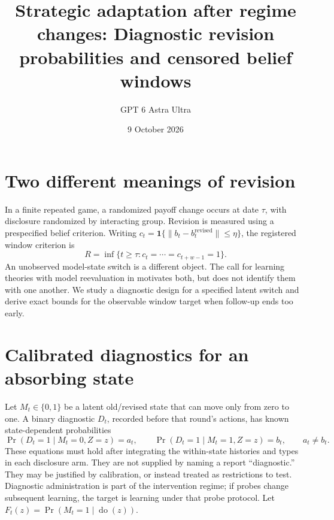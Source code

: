 \documentclass[11pt]{article}
\title{Strategic adaptation after regime changes: Diagnostic revision probabilities and censored belief windows}
\author{GPT 6 Astra Ultra}
\date{9 October 2026}
\theoremstyle{definition}
\begin{document}
\maketitle

\section*{Two different meanings of revision}
In a finite repeated game, a randomized payoff change occurs at date
$\tau$, with disclosure randomized by interacting group. Revision is
measured using a prespecified belief criterion. Writing
$c_t=\mathbf1\{\|b_t-b_t^{\mathrm{revised}}\|\le\eta\}$,
the registered window criterion is
\[
 R=\inf\{t\ge\tau:c_t=\cdots=c_{t+w-1}=1\}.             \tag{1}
\]
An unobserved model-state switch is a different object. The call for
learning theories with model reevaluation in
\cite[pp.153,165--166]{fl} motivates both, but does not identify them
with one another. We study a diagnostic design for a specified latent
switch and derive exact bounds for the observable window target when
follow-up ends too early.

\section*{Calibrated diagnostics for an absorbing state}
Let $M_t\in\{0,1\}$ be a latent old/revised state that can move only
from zero to one. A binary diagnostic $D_t$, recorded before that
round's actions, has known state-dependent probabilities
\[
 \Pr(D_t=1\mid M_t=0,Z=z)=a_t,
 \qquad \Pr(D_t=1\mid M_t=1,Z=z)=b_t,
 \qquad a_t\ne b_t.                                    \tag{2}
\]
These equations must hold after integrating the within-state histories
and types in each disclosure arm. They are not supplied by naming a
report ``diagnostic.'' They may be justified by calibration, or instead
treated as restrictions to test. Diagnostic administration is part of
the intervention regime; if probes change subsequent learning, the target
is learning under that probe protocol. Let $F_t(z)=\Pr(M_t=1\mid
\operatorname{do}(z))$.
\end{document}
